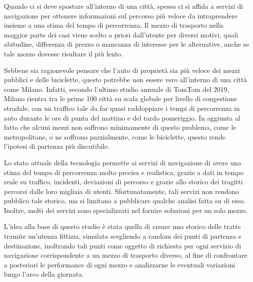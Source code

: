 Quando ci si deve spostare all'interno di una città, spesso ci si affida a servizi di navigazione per ottenere informazioni sul percorso più veloce da intraprendere insieme a una stima del tempo di percorrenza.
Il mezzo di trasporto nella maggior parte dei casi viene scelto a priori dall'utente per diversi motivi, quali abitudine, differenza di prezzo o mancanza di interesse per le alternative, anche se tale mezzo dovesse risultare il più lento.

Sebbene sia ragionevole pensare che l'auto di proprietà sia più veloce dei mezzi pubblici e delle biciclette, questo potrebbe non essere vero all'interno di una città come Milano. Infatti, secondo l'ultimo studio annuale di TomTom del 2019\cite{tomtomindexmilan}, Milano rientra tra le prime 100 città su scala globale per livello di congestione stradale, con un traffico tale da far quasi raddoppiare i tempi di percorrenza in auto durante le ore di punta del mattino e del tardo pomeriggio. In aggiunta al fatto che alcuni mezzi non soffrono minimamente di questo problema, come le metropolitane, o ne soffrono parzialmente, come le biciclette, questo rende l'ipotesi di partenza più discutibile.

Lo stato attuale della tecnologia permette ai servizi di navigazione di avere una stima del tempo di percorrenza molto precisa e realistica, grazie a dati in tempo reale su traffico, incidenti, deviazioni di percorso e grazie allo storico dei tragitti percorsi dalle loro migliaia di utenti. Sfortunatamente, tali servizi non rendono pubblico tale storico, ma si limitano a pubblicare qualche analisi fatta su di esso. Inoltre, molti dei servizi sono specializzati nel fornire soluzioni per un solo mezzo.

\cite{croci2014}

\cite{rotaris2010}

\cite{rotaris2019}

\cite{meinardi2008}

L'idea alla base di questo studio è stata quella di creare uno storico delle tratte tramite un'utenza fittizia, simulata scegliendo a random dei punti di partenza e destinazione, inoltrando tali punti come oggetto di richiesta per ogni servizio di navigazione corrispondente a un mezzo di trasporto diverso, al fine di confrontare a posteriori le performance di ogni mezzo e analizzarne le eventuali variazioni lungo l'arco della giornata.